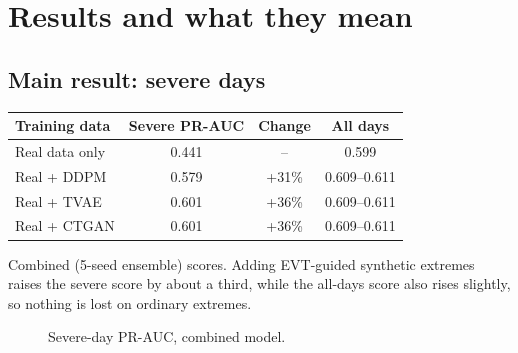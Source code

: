 \chapter{Results and what they mean}
\label{ch:results}

\section{Main result: severe days}
\begin{center}
\begin{tabular}{lccc}
\toprule
\textbf{Training data} & \textbf{Severe PR-AUC} & \textbf{Change} & \textbf{All days}\\
\midrule
Real data only & 0.441 & -- & 0.599\\
Real + DDPM & 0.579 & +31\% & 0.609--0.611\\
Real + TVAE & 0.601 & +36\% & 0.609--0.611\\
Real + CTGAN & 0.601 & +36\% & 0.609--0.611\\
\bottomrule
\end{tabular}
\end{center}
Combined (5-seed ensemble) scores. Adding EVT-guided synthetic extremes raises the severe score by about a third, while
the all-days score also rises slightly, so nothing is lost on ordinary extremes.

\begin{figure}[H]
\centering
{}
\caption{Severe-day PR-AUC, combined model.}
\end{figure}

